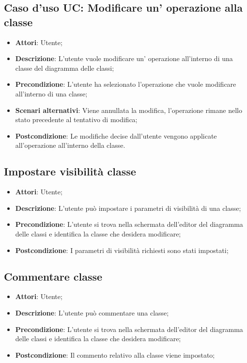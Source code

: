 \documentclass[../AnalisiDeiRequisiti.tex]{subfiles}
\begin{document}
			\subsection{Caso d'uso UC: Modificare un' operazione alla classe}
			\begin{itemize}
				\item \textbf{Attori}: Utente;
				
				\item \textbf{Descrizione}: L'utente vuole modificare un' operazione all'interno di una classe del diagramma delle classi;
				
				\item \textbf{Precondizione}: L'utente ha selezionato l'operazione che vuole modificare all'interno di una classe;
				
				\item \textbf{Scenari alternativi}: Viene annullata la modifica, l'operazione 
				rimane nello stato precedente al tentativo di modifica;
				
				\item \textbf{Postcondizione}: Le modifiche decise dall'utente vengono applicate all'operazione all'interno della classe.
			\end{itemize}
			
			
			\subsection{Impostare visibilità classe}
			\begin{itemize}
				\item \textbf{Attori}: Utente;
				\item \textbf{Descrizione}: L'utente può impostare i parametri di visibilità di una classe;
				\item \textbf{Precondizione}: L’utente si trova nella schermata dell'editor del diagramma delle classi e identifica la classe che desidera modificare;
				\item \textbf{Postcondizione}: I parametri di visibilità richiesti sono stati impostati;
			\end{itemize}
			
			\subsection{Commentare classe}
			\begin{itemize}
				\item \textbf{Attori}: Utente;
				\item \textbf{Descrizione}: L'utente può commentare una classe;
				\item \textbf{Precondizione}: L’utente si trova nella schermata dell'editor del diagramma delle classi e identifica la classe che desidera modificare;
				\item \textbf{Postcondizione}: Il commento relativo alla classe viene impostato;
			\end{itemize}
			
\end{document}
